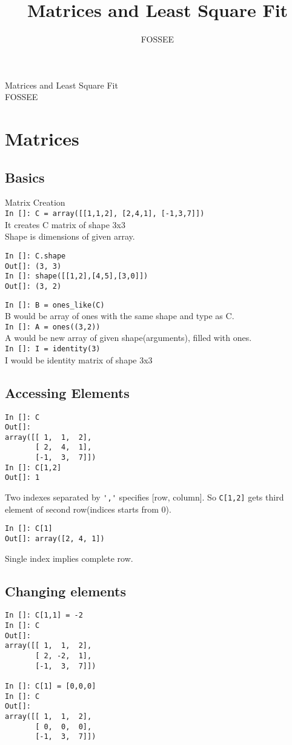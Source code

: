 \documentclass[12pt]{article}
\title{Matrices and Least Square Fit}
\author{FOSSEE}
\newcommand{\typ}[1]{\lstinline{#1}}
\begin{document}
\date{}
\vspace{-1in}
\begin{center}
\LARGE{Matrices and Least Square Fit}\\
\large{FOSSEE}
\end{center}
\section{Matrices}
\subsection{Basics}
Matrix Creation\\
\typ{In []: C = array([[1,1,2], [2,4,1], [-1,3,7]])}\\
It creates C matrix of shape 3x3\\
Shape is dimensions of given array.
\begin{lstlisting}
In []: C.shape 
Out[]: (3, 3)
In []: shape([[1,2],[4,5],[3,0]])
Out[]: (3, 2)
\end{lstlisting}
\typ{In []: B = ones_like(C)} \\
B would be array of ones with the same shape and type as C.\\
\typ{In []: A = ones((3,2))} \\
A would be new array of given shape(arguments), filled with ones.\\ 
\typ{In []: I = identity(3)}\\
I would be identity matrix of shape 3x3

\subsection{Accessing Elements}
\begin{lstlisting}
In []: C
Out[]: 
array([[ 1,  1,  2],
       [ 2,  4,  1],
       [-1,  3,  7]])
In []: C[1,2]
Out[]: 1
\end{lstlisting}
Two indexes separated by \typ{','} specifies [row, column]. So \typ{C[1,2]} gets third element of second row(indices starts from 0).
\newpage
\begin{lstlisting}
In []: C[1]
Out[]: array([2, 4, 1])
\end{lstlisting}
Single index implies complete row.
\subsection{Changing elements}
\begin{lstlisting}
In []: C[1,1] = -2
In []: C
Out[]: 
array([[ 1,  1,  2],
       [ 2, -2,  1],
       [-1,  3,  7]])

In []: C[1] = [0,0,0]
In []: C
Out[]: 
array([[ 1,  1,  2],
       [ 0,  0,  0],
       [-1,  3,  7]])
\end{lstlisting}
\end{document}
